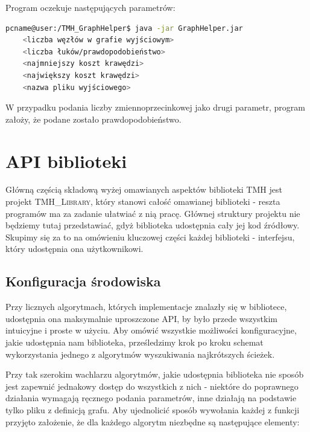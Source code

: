 Program oczekuje następujących parametrów:

\begin{lstlisting}[language=bash]
pcname@user:/TMH_GraphHelper$ java -jar GraphHelper.jar
	<liczba węzłów w grafie wyjściowym>
	<liczba łuków/prawdopodobieństwo>
	<najmniejszy koszt krawędzi>
	<największy koszt krawędzi>
	<nazwa pliku wyjściowego>
\end{lstlisting}

W przypadku podania liczby zmiennoprzecinkowej jako drugi parametr, program założy, że podane zostało prawdopodobieństwo.

\section{API biblioteki}

Główną częścią składową wyżej omawianych aspektów biblioteki \textsc{TMH} jest projekt \textsc{TMH\_Library}, który stanowi całość omawianej biblioteki - reszta programów ma za zadanie ułatwiać z nią pracę. Głównej struktury projektu nie będziemy tutaj przedstawiać, gdyż biblioteka udostępnia cały jej kod źródłowy. Skupimy się za to na omówieniu kluczowej części każdej biblioteki - interfejsu, który udostępnia ona użytkownikowi.

\subsection{Konfiguracja środowiska}

Przy licznych algorytmach, których implementacje znalazły się w bibliotece, udostępnia ona maksymalnie uproszczone API, by było przede wszystkim intuicyjne i proste w użyciu. Aby omówić wszystkie możliwości konfiguracyjne, jakie udostępnia nam biblioteka, prześledzimy krok po kroku schemat wykorzystania jednego z algorytmów wyszukiwania najkrótszych ścieżek.

Przy tak szerokim wachlarzu algorytmów, jakie udostępnia biblioteka nie sposób jest zapewnić jednakowy dostęp do wszystkich z nich - niektóre do poprawnego działania wymagają ręcznego podania parametrów, inne działają na podstawie tylko pliku z definicją grafu. Aby ujednolicić sposób wywołania każdej z funkcji przyjęto założenie, że dla każdego algorytm niezbędne są następujące elementy:


